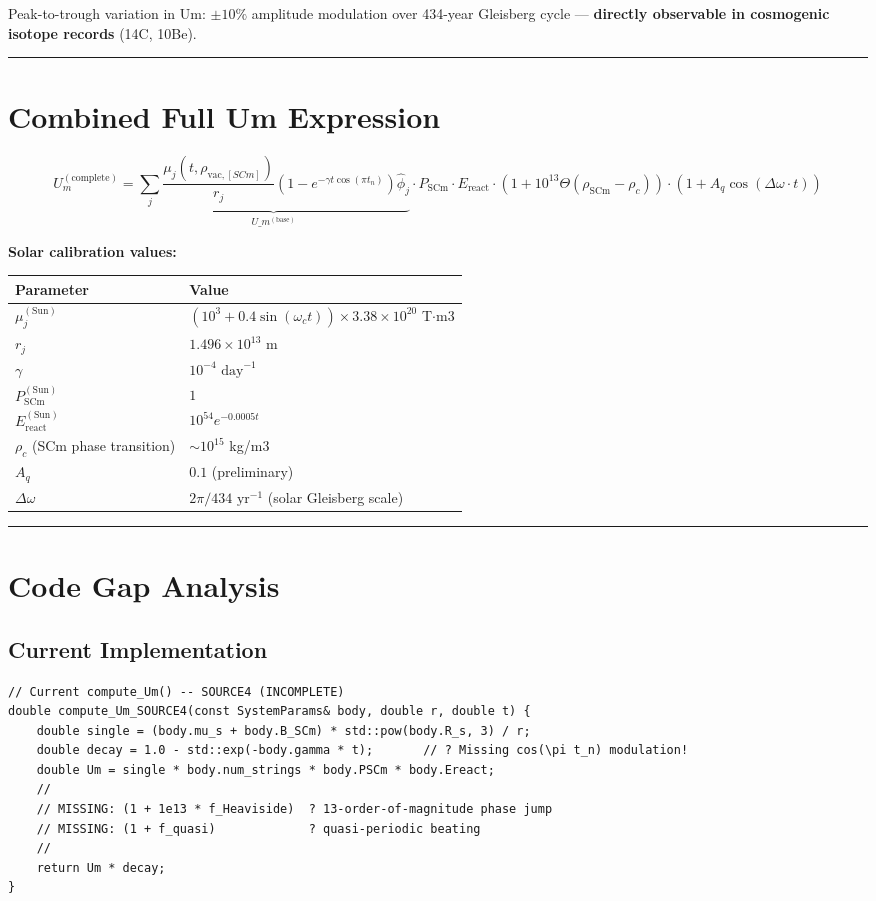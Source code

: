 \documentclass[12pt,a4paper]{article}
\begin{document}
Peak-to-trough variation in Um: $\pm 10\%$ amplitude modulation over 434-year Gleisberg cycle --- \textbf{directly observable in cosmogenic isotope records} (14C, 10Be).

\medskip\hrule\medskip

\section{Combined Full Um Expression}

\begin{equation}
\boxed{U_m^{(\text{complete})} = \underbrace{\sum_j \frac{\mu_j(t,\rho_{\text{vac},[SCm]})}{r_j} (1-e^{-\gamma t \cos(\pi t_n)}) \hat{\phi}_j}_{U\_m^{(\text{base})}} \cdot P_{\text{SCm}} \cdot E_{\text{react}} \cdot \left(1 + 10^{13} \Theta(\rho_{\text{SCm}} - \rho_c)\right) \cdot \left(1 + A_q \cos(\Delta\omega \cdot t)\right)}
\end{equation}

\textbf{Solar calibration values:}

\begin{table}[H]
\centering
\small
\begin{tabularx}{\linewidth}{@{}>{\raggedright\arraybackslash}X>{\raggedright\arraybackslash}X@{}}
\toprule
Parameter & Value \tabularnewline
\midrule
$\mu_j^{(\text{Sun})}$ & $(10^3 + 0.4\sin(\omega_c t)) \times 3.38 \times 10^{20}$ T$\cdot$m3 \tabularnewline
$r_j$ & $1.496 \times 10^{13}$ m \tabularnewline
$\gamma$ & $10^{-4}$ $\mathrm{day}^{-1}$ \tabularnewline
$P_{\text{SCm}}^{(\text{Sun})}$ & $1$ \tabularnewline
$E_{\text{react}}^{(\text{Sun})}$ & $10^{54} e^{-0.0005t}$ \tabularnewline
$\rho_c$ (SCm phase transition) & $\sim 10^{15}$ kg/m3 \tabularnewline
$A_q$ & $0.1$ (preliminary) \tabularnewline
$\Delta\omega$ & $2\pi / 434$ $\mathrm{yr}^{-1}$ (solar Gleisberg scale) \tabularnewline
\bottomrule
\end{tabularx}
\end{table}

\medskip\hrule\medskip

\section{Code Gap Analysis}

\subsection{Current Implementation}

\begin{verbatim}
// Current compute_Um() -- SOURCE4 (INCOMPLETE)
double compute_Um_SOURCE4(const SystemParams& body, double r, double t) {
    double single = (body.mu_s + body.B_SCm) * std::pow(body.R_s, 3) / r;
    double decay = 1.0 - std::exp(-body.gamma * t);       // ? Missing cos(\pi t_n) modulation!
    double Um = single * body.num_strings * body.PSCm * body.Ereact;
    //
    // MISSING: (1 + 1e13 * f_Heaviside)  ? 13-order-of-magnitude phase jump
    // MISSING: (1 + f_quasi)             ? quasi-periodic beating
    //
    return Um * decay;
}
\end{verbatim}
\end{document}
